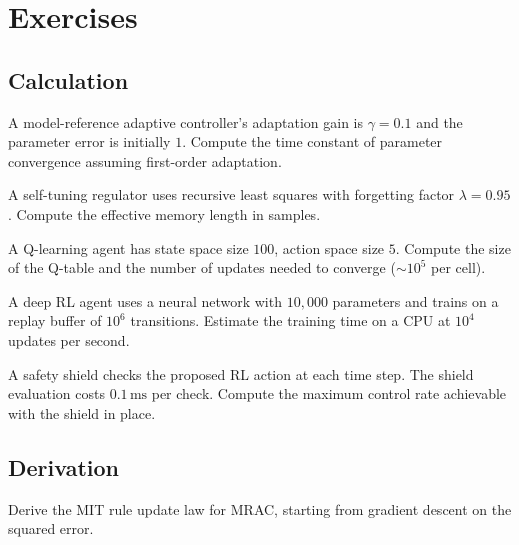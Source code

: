 \section{Exercises}

\subsection*{Calculation}

\begin{exercise}
A model-reference adaptive controller's adaptation gain is $\gamma = 0.1$ and the parameter error is initially $1$. Compute the time constant of parameter convergence assuming first-order adaptation.
\end{exercise}

\begin{exercise}
A self-tuning regulator uses recursive least squares with forgetting factor $\lambda = 0.95$. Compute the effective memory length in samples.
\end{exercise}

\begin{exercise}
A Q-learning agent has state space size $100$, action space size $5$. Compute the size of the Q-table and the number of updates needed to converge ($\sim 10^5$ per cell).
\end{exercise}

\begin{exercise}
A deep RL agent uses a neural network with $10{,}000$ parameters and trains on a replay buffer of $10^6$ transitions. Estimate the training time on a CPU at $10^4$ updates per second.
\end{exercise}

\begin{exercise}
A safety shield checks the proposed RL action at each time step. The shield evaluation costs $0.1\,\text{ms}$ per check. Compute the maximum control rate achievable with the shield in place.
\end{exercise}

\subsection*{Derivation}

\begin{exercise}
Derive the MIT rule update law for MRAC, starting from gradient descent on the squared error.
\end{exercise}

